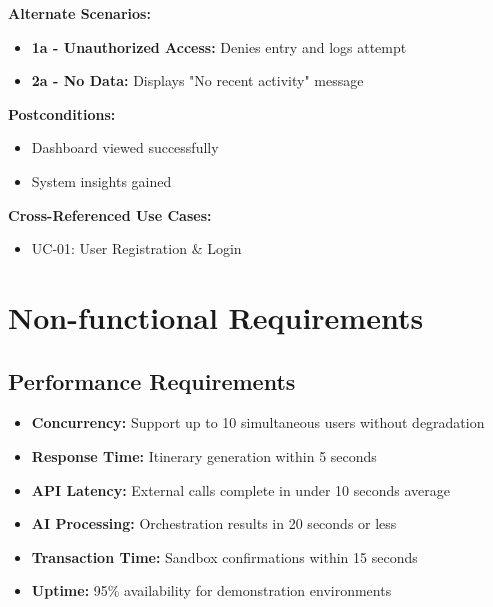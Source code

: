 \documentclass[12pt,a4paper]{article}
\begin{document}
\textbf{Alternate Scenarios:}
\begin{itemize}[leftmargin=1.5cm, itemsep=0.3em]
    \item \textbf{1a - Unauthorized Access:} Denies entry and logs attempt
    \item \textbf{2a - No Data:} Displays "No recent activity" message
\end{itemize}

\textbf{Postconditions:}
\begin{itemize}[leftmargin=1.5cm, itemsep=0.3em]
    \item Dashboard viewed successfully
    \item System insights gained
\end{itemize}

\textbf{Cross-Referenced Use Cases:}
\begin{itemize}[leftmargin=1.5cm, itemsep=0.3em]
    \item UC-01: User Registration \& Login
\end{itemize}
\newpage
\section{Non-functional Requirements}
\subsection{Performance Requirements}
\begin{infobox}
\begin{itemize}[leftmargin=*, itemsep=0.3em]
    \item \textbf{Concurrency:} Support up to 10 simultaneous users without degradation
    \item \textbf{Response Time:} Itinerary generation within 5 seconds
    \item \textbf{API Latency:} External calls complete in under 10 seconds average
    \item \textbf{AI Processing:} Orchestration results in 20 seconds or less
    \item \textbf{Transaction Time:} Sandbox confirmations within 15 seconds
    \item \textbf{Uptime:} 95\% availability for demonstration environments
\end{itemize}
\end{infobox}
\end{document}
